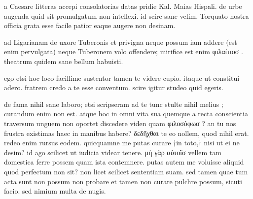 


 a Caesare litteras accepi consolatorias datas pridie Kal. Maias Hispali. de urbe augenda quid sit promulgatum non intellexi. id scire sane velim. Torquato nostra officia grata esse facile patior eaque augere non desinam.

 ad Ligarianam de uxore Tuberonis et privigna neque possum iam addere (est enim pervulgata) neque Tuberonem volo offendere; mirifice est enim φιλαίτιοσ . theatrum quidem sane bellum habuisti.

 ego etsi hoc loco facillime sustentor tamen te videre cupio. itaque ut constitui adero. fratrem credo a te esse conventum. scire igitur studeo quid egeris.

 de fama nihil sane laboro; etsi scripseram ad te tunc stulte nihil melius ; curandum enim non est. atque hoc in omni vita sua quemque a recta conscientia traversum unguem non oportet discedere viden quam φιλοσόφωσ ? an tu nos frustra existimas haec in manibus habere? δεδῆχθαι te eo nollem, quod nihil erat. redeo enim rursus eodem. quicquamne me putas curare †in toto,† nisi ut ei ne desim? id ago scilicet ut iudicia videar tenere. μὴ γὰρ αὐτοῖσ vellem tam domestica ferre possem quam ista contemnere. putas autem me voluisse aliquid quod perfectum non sit? non licet scilicet sententiam suam. sed tamen quae tum acta sunt non possum non probare et tamen non curare pulchre possum, sicuti facio. sed nimium multa de nugis.
